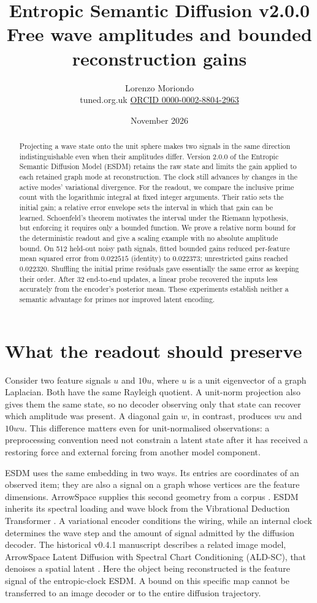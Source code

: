 \documentclass[11pt,a4paper]{article}
\title{\textbf{Entropic Semantic Diffusion v2.0.0}\\
  Free wave amplitudes and bounded reconstruction gains}
\author{Lorenzo Moriondo\\[-1pt]
  \small tuned.org.uk \quad\textbar\quad
  \href{https://orcid.org/0000-0002-8804-2963}{ORCID 0000-0002-8804-2963}}
\date{November 2026}
\begin{document}
\maketitle
\begin{abstract}
Projecting a wave state onto the unit sphere makes two signals in the same
direction indistinguishable even when their amplitudes differ. Version 2.0.0
of the Entropic Semantic Diffusion Model (ESDM) retains the raw state and
limits the gain applied to each retained graph mode at reconstruction. The
clock still advances by changes in the active modes' variational divergence.
For the readout, we compare the inclusive prime count with the logarithmic
integral at fixed integer arguments. Their ratio sets the initial gain;
a relative error envelope sets the interval in which that gain can be learned.
Schoenfeld's theorem motivates the interval under the Riemann hypothesis,
but enforcing it requires only a bounded function. We prove a relative norm
bound for the deterministic readout and give a scaling example with no
absolute amplitude bound. On 512 held-out noisy path signals, fitted bounded
gains reduced per-feature mean squared error from $0.022515$ (identity) to
$0.022373$; unrestricted gains reached $0.022320$. Shuffling the initial
prime residuals gave essentially the same error as keeping their order.
After 32 end-to-end updates, a linear probe recovered the inputs less
accurately from the encoder's posterior mean. These experiments establish
neither a semantic advantage for primes nor improved latent encoding.
\end{abstract}

\section{What the readout should preserve}
Consider two feature signals $u$ and $10u$, where $u$ is a unit eigenvector
of a graph Laplacian. Both have the same Rayleigh quotient. A unit-norm
projection also gives them the same state, so no decoder observing only that
state can recover which amplitude was present. A diagonal gain $w$, in
contrast, produces $wu$ and $10wu$. This difference matters even for
unit-normalised observations: a preprocessing convention need not constrain a
latent state after it has received a restoring force and external forcing from
another model component.

ESDM uses the same embedding in two ways. Its entries are coordinates of an
observed item; they are also a signal on a graph whose vertices are the
feature dimensions. ArrowSpace supplies this second geometry from a corpus
\cite{arrowspace}. ESDM inherits its spectral loading and wave block from
the Vibrational Deduction Transformer \cite{vdt}. A variational encoder
conditions the wiring, while an internal clock determines the wave step and the
amount of signal admitted by the diffusion decoder. The historical v0.4.1
manuscript describes a related image model, ArrowSpace Latent Diffusion with
Spectral Chart Conditioning (ALD-SC), that denoises a spatial latent
\cite{archive}. Here the object being
reconstructed is the feature signal of the entropic-clock ESDM. A bound on
this specific map cannot be transferred to an image decoder or to the entire
diffusion trajectory.
\end{document}
